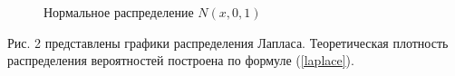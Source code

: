 \documentclass[12pt]{article}
\newcommand{\lskip}{\hfill\break}
\begin{document}
\begin{flushleft}
\begin{figure}[h]
\begin{minipage}[h]{0.325\linewidth}
        \end{minipage}
        \caption{Нормальное распределение $N(x, 0, 1)$}
    \end{figure}
    \lskip

     Рис. 2 представлены графики распределения Лапласа. Теоретическая плотность распределения вероятностей построена по формуле (\ref{laplace}).

    \begin{figure}[h!]
        \begin{minipage}[h]{0.325\linewidth}
        \end{minipage}
        \begin{minipage}[h]{0.325\linewidth}
        \end{minipage}
        \begin{minipage}[h]{0.325\linewidth}

\end{minipage}
\end{figure}
\end{flushleft}
\end{document}
